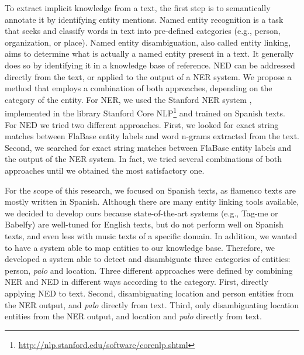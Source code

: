 To extract implicit knowledge from a text, the first step is to semantically annotate it by identifying entity mentions. Named entity recognition is a task that seeks and classify words in text into pre-defined categories (e.g., person, organization, or place). Named entity disambiguation, also called entity linking, aims to determine what is actually a named entity present in a text. It generally does so by identifying it in a knowledge base of reference. NED can be addressed directly from the text, or applied to the output of a NER system. We propose a method that employs a combination of both approaches, depending on the category of the entity. For NER, we used the Stanford NER system \cite{Finkel2005}, implemented in the library Stanford Core NLP\footnote{\url{http://nlp.stanford.edu/software/corenlp.shtml}} and trained on Spanish texts. For NED we tried two different approaches. First, we looked for exact string matches between FlaBase entity labels and word n-grams extracted from the text. Second, we searched for exact string matches between FlaBase entity labels and the output of the NER system. In fact, we tried several combinations of both approaches until we obtained the most satisfactory one.

For the scope of this research, we focused on Spanish texts, as flamenco texts are mostly written in Spanish. Although there are many entity linking tools available, we decided to develop ours because state-of-the-art systems (e.g., Tag-me or Babelfy) are well-tuned for English texts, but do not perform well on Spanish texts, and even less with music texts of a specific domain. In addition, we wanted to have a system able to map entities to our knowledge base. Therefore, we developed a system able to detect and disambiguate three categories of entities: person, \textit{palo} and location. Three different approaches were defined by combining NER and NED in different ways according to the category. First, directly applying NED to text. Second, disambiguating location and person entities from the NER output, and \textit{palo} directly from text. Third, only disambiguating location entities from the NER output, and location and \textit{palo} directly from text.

